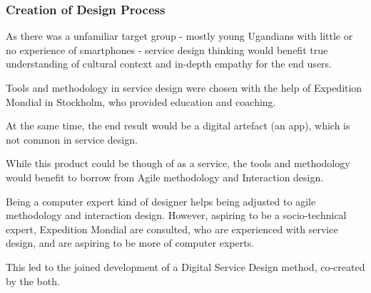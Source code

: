


\subsubsection{Creation of Design Process}
As there was a unfamiliar target group - mostly young Ugandians with little or no experience of smartphones - service design thinking would benefit true understanding of cultural context and in-depth empathy for the end users.

Tools and methodology in service design were chosen with the help of Expedition Mondial in Stockholm, who provided education and coaching.

At the same time, the end result would be a digital artefact (an app), which is not common in service design.

While this product could be though of as a service, the tools and methodology would benefit to borrow from Agile methodology and Interaction design.

Being a computer expert kind of designer \citep{lowgren} helps being adjusted to agile methodology and interaction design. However, aspiring to be a socio-technical expert, Expedition Mondial are consulted, who are experienced with service design, and are aspiring to be more of computer experts.

This led to the joined development of a Digital Service Design method, co-created by the both.



